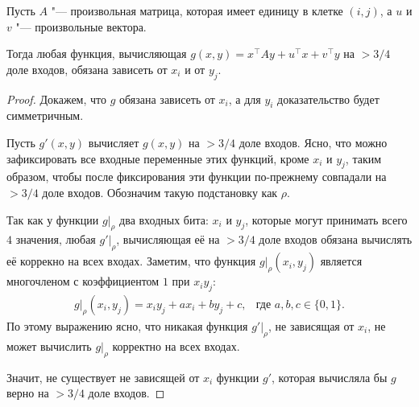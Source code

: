 \documentclass[a4paper, 14pt]{extarticle}
\begin{document}
\begin{lemma} \label{single_one}
Пусть $A$ "--- произвольная матрица, которая имеет единицу в клетке $(i, j)$, а
$u$ и $v$ "--- произвольные вектора.

Тогда любая функция, вычисляющая $g(x, y) = x^\top A y + u^\top x + v^\top y$ на
$> 3/4$ доле входов, обязана зависеть от $x_i$ и от $y_j$.
\end{lemma}
\begin{proof}
Докажем, что $g$ обязана зависеть от $x_i$, а для $y_i$ доказательство будет
симметричным.

Пусть $g'(x, y)$ вычисляет $g(x, y)$ на $> 3/4$ доле входов. Ясно, что можно
зафиксировать все входные переменные этих функций, кроме $x_i$ и $y_j$, таким
образом, чтобы после фиксирования эти функции по-прежнему совпадали на $> 3/4$
доле входов. Обозначим такую подстановку как $\rho$.

Так как у функции $g \rvert _ \rho$ два входных бита: $x_i$ и $y_j$, которые
могут принимать всего $4$ значения, любая $g' \rvert _ \rho$, вычисляющая
её на $> 3/4$ доле входов обязана вычислять её коррекно на всех входах. Заметим,
что функция $g \rvert _ \rho(x_i, y_j)$ является многочленом с коэффициентом $1$
при $x_i y_j$:
\[
\begin{aligned}
&g \rvert _ \rho (x_i, y_j) = x_i y_j + a x_i + b y_j + c,
&
\text{где $a, b, c \in \{0, 1\}$.}&
\end{aligned}
\]
По этому выражению ясно, что никакая функция $g' \rvert _ \rho$, не зависящая от
$x_i$, не может вычислить $g \rvert _ \rho$ корректно на всех входах.

Значит, не существует не зависящей от $x_i$ функции $g'$, которая вычисляла бы
$g$ верно на $> 3/4$ доле входов.
\end{proof}
\end{document}
